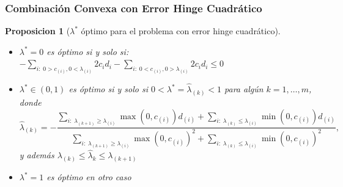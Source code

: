 \documentclass[aspectratio=43]{beamer}
\newtheorem{proposition}[theorem]{Proposicion}
\newcommand{\mymax}[1]{\max\left(#1\right)}
\newcommand{\mymin}[1]{\min\left(#1\right)}
\newcommand{\npertask}{m}
\begin{document}
\begin{frame}
      \frametitle{Combinación Convexa con Error Hinge Cuadrático}


      \begin{proposition}[$\lambda^*$ óptimo para el problema con error hinge cuadrático]\nonumber%
            \begin{itemize}
                  \item $\lambda^*=0$ es óptimo si y solo si: $-\sum_{i:\; 0 > c_{(i)}, 0 < \lambda_{(i)}} {2 c_i d_i} - \sum_{i:\; 0 < c_{(i)}, 0 > \lambda_{(i)}} {2 c_i d_i}  \leq 0 $
                  \item $\lambda^* \in (0,1)$ es óptimo si y solo si $0 < \lambda^* = \widehat{\lambda}_{(k)} < 1$ para algún $k=1, \dotsc, \npertask$, donde
                  \begin{equation}\nonumber%
                        \widehat{\lambda}_{(k)} = - \frac{\sum_{i:\; \lambda_{(k+1)} \geq \lambda_{(i)}} \mymax{0, c_{(i)}} d_{(i)} + \sum_{i:\; \lambda_{(k)} \leq \lambda_{(i)}} \mymin{0, c_{(i)}} d_{(i)}}{\sum_{i:\; \lambda_{(k+1)} \geq \lambda_{(i)}} \mymax{0, c_{(i)}}^2 + \sum_{i:\; \lambda_{(k)} \leq \lambda_{(i)}} \mymin{0, c_{(i)}}^2} ,
                  \end{equation}
                  y además $\lambda_{(k)} \leq \widehat{\lambda}_k \leq  \lambda_{(k+1)}$
                  \item $\lambda^*=1$ es óptimo en otro caso
            \end{itemize}
        \end{proposition}


\end{frame}
\end{document}
